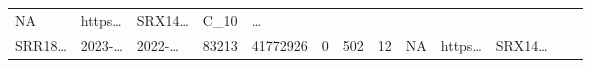\documentclass[
]{article}
\begin{document}
\begin{longtable}[]{@{}lllllllllllll@{}}
\begin{minipage}[t]{0.05\columnwidth}
NA\strut
\end{minipage} & \begin{minipage}[t]{0.05\columnwidth}\raggedright
https\ldots{}\strut
\end{minipage} & \begin{minipage}[t]{0.05\columnwidth}\raggedright
SRX14\ldots{}\strut
\end{minipage} & \begin{minipage}[t]{0.08\columnwidth}\raggedright
C\_10\strut
\end{minipage} & \begin{minipage}[t]{0.02\columnwidth}\raggedright
\ldots{}\strut
\end{minipage}\tabularnewline
\begin{minipage}[t]{0.05\columnwidth}\raggedright
SRR18\ldots{}\strut
\end{minipage} & \begin{minipage}[t]{0.05\columnwidth}\raggedright
2023-\ldots{}\strut
\end{minipage} & \begin{minipage}[t]{0.05\columnwidth}\raggedright
2022-\ldots{}\strut
\end{minipage} & \begin{minipage}[t]{0.04\columnwidth}\raggedright
83213\strut
\end{minipage} & \begin{minipage}[t]{0.05\columnwidth}\raggedright
41772926\strut
\end{minipage} & \begin{minipage}[t]{0.05\columnwidth}\raggedright
0\strut
\end{minipage} & \begin{minipage}[t]{0.05\columnwidth}\raggedright
502\strut
\end{minipage} & \begin{minipage}[t]{0.05\columnwidth}\raggedright
12\strut
\end{minipage} & \begin{minipage}[t]{0.05\columnwidth}\raggedright
NA\strut
\end{minipage} & \begin{minipage}[t]{0.05\columnwidth}\raggedright
https\ldots{}\strut
\end{minipage} & \begin{minipage}[t]{0.05\columnwidth}\raggedright
SRX14\ldots{}\strut
\end{minipage} & \begin{minipage}[t]{0.08\columnwidth}\raggedright

\end{minipage}
\end{longtable}
\end{document}
